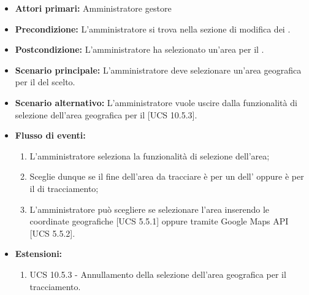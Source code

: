 \begin{itemize}
\item \textbf{Attori primari:} Amministratore gestore
\item \textbf{Precondizione:} L'amministratore si trova nella sezione di modifica dei .
\item \textbf{Postcondizione:} L'amministratore ha selezionato un'area per il .
\item \textbf{Scenario principale:} L'amministratore deve selezionare un'area geografica per il  del  scelto.
\item \textbf{Scenario alternativo:} L'amministratore vuole uscire dalla funzionalità di selezione dell'area geografica per il  [UCS 10.5.3].
\item \textbf{Flusso di eventi:}
\begin{enumerate}
    \item L'amministratore seleziona la funzionalità di selezione dell'area;
    \item Sceglie dunque se il fine dell'area da tracciare è per un  dell' oppure è per il  di tracciamento;
    \item L'amministratore può scegliere se selezionare l'area inserendo le coordinate geografiche [UCS 5.5.1] oppure tramite Google Maps API [UCS 5.5.2].
\end{enumerate}
\item \textbf{Estensioni:}
    \begin{enumerate}
        \item UCS 10.5.3 - Annullamento della selezione dell'area geografica per il tracciamento.
    \end{enumerate}
\end{itemize}

